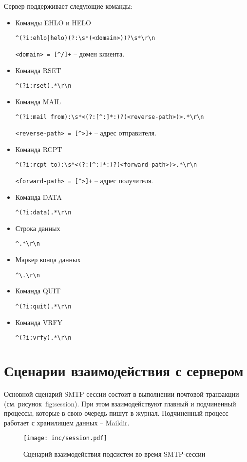 Сервер поддерживает следующие команды:
\begin{itemize}
\item Команды EHLO и HELO

\verb;^(?i:ehlo|helo)(?:\s*(<domain>))?\s*\r\n;

\verb;<domain> = [^/]+; -- домен клиента.

\item Команда RSET

\verb;^(?i:rset).*\r\n;

\item Команда MAIL

\verb;^(?i:mail from):\s*<(?:[^:]*:)?(<reverse-path>)>.*\r\n;

\verb;<reverse-path> = [^>]+; -- адрес отправителя.

\item Команда RCPT

\verb;^(?i:rcpt to):\s*<(?:[^:]*:)?(<forward-path>)>.*\r\n;

\verb;<forward-path> = [^>]+; -- адрес получателя.

\item Команда DATA

\verb;^(?i:data).*\r\n;

\item Строка данных

\verb;^.*\r\n;

\item Маркер конца данных

\verb;^\.\r\n;

\item Команда QUIT

\verb;^(?i:quit).*\r\n;

\item Команда VRFY

\verb;^(?i:vrfy).*\r\n;

\end{itemize}

\section{Сценарии взаимодействия с сервером}

Основной сценарий SMTP-сессии состоит в выполнении почтовой транзакции (см. рисунок~{fig:session}).
При этом взаимодействуют главный и подчиненный процессы, которые в свою очередь пишут в журнал.
Подчиненный процесс работает с хранилищем данных -- Maildir.

\begin{figure}[ht!]
	\centering
	\texttt{[image: inc/session.pdf]}
	\caption{Сценарий взаимодействия подсистем во время SMTP-сессии}
	\label{fig:session}
\end{figure}

